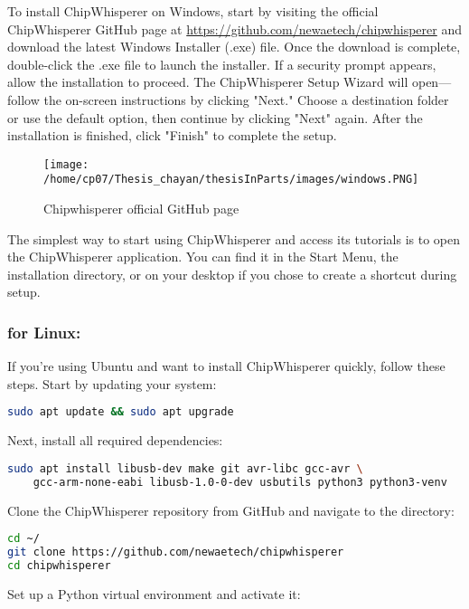 To install ChipWhisperer on Windows, start by visiting the official ChipWhisperer GitHub page at \hyperlink{https://github.com/newaetech/chipwhisperer}{https://github.com/newaetech/chipwhisperer}  and download the latest Windows Installer (.exe) file. Once the download is complete, double-click the .exe file to launch the installer. If a security prompt appears, allow the installation to proceed. The ChipWhisperer Setup Wizard will open—follow the on-screen instructions by clicking "Next." Choose a destination folder or use the default option, then continue by clicking "Next" again. After the installation is finished, click "Finish" to complete the setup.
\begin{figure}[h]
    \centering
    \texttt{[image: /home/cp07/Thesis\_chayan/thesisInParts/images/windows.PNG]}
    \caption{Chipwhisperer official GitHub page}
    \label{fig:windows_installation}
\end{figure}
The simplest way to start using ChipWhisperer and access its tutorials is to open the ChipWhisperer application. You can find it in the Start Menu, the installation directory, or on your desktop if you chose to create a shortcut during setup.

\subsubsection{for Linux:}
If you're using Ubuntu and want to install ChipWhisperer quickly, follow these steps. Start by updating your system:

\begin{lstlisting}[language=bash]
sudo apt update && sudo apt upgrade
\end{lstlisting}

Next, install all required dependencies:

\begin{lstlisting}[language=bash]
sudo apt install libusb-dev make git avr-libc gcc-avr \
    gcc-arm-none-eabi libusb-1.0-0-dev usbutils python3 python3-venv
\end{lstlisting}

Clone the ChipWhisperer repository from GitHub and navigate to the directory:

\begin{lstlisting}[language=bash]
cd ~/
git clone https://github.com/newaetech/chipwhisperer
cd chipwhisperer
\end{lstlisting}

Set up a Python virtual environment and activate it:

